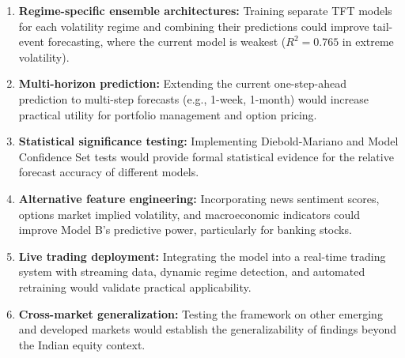 \begin{enumerate}
    \item \textbf{Regime-specific ensemble architectures:} Training separate TFT models for each volatility regime and combining their predictions could improve tail-event forecasting, where the current model is weakest ($R^2 = 0.765$ in extreme volatility).

    \item \textbf{Multi-horizon prediction:} Extending the current one-step-ahead prediction to multi-step forecasts (e.g., 1-week, 1-month) would increase practical utility for portfolio management and option pricing.

    \item \textbf{Statistical significance testing:} Implementing Diebold-Mariano and Model Confidence Set tests would provide formal statistical evidence for the relative forecast accuracy of different models.

    \item \textbf{Alternative feature engineering:} Incorporating news sentiment scores, options market implied volatility, and macroeconomic indicators could improve Model B's predictive power, particularly for banking stocks.

    \item \textbf{Live trading deployment:} Integrating the model into a real-time trading system with streaming data, dynamic regime detection, and automated retraining would validate practical applicability.

    \item \textbf{Cross-market generalization:} Testing the framework on other emerging and developed markets would establish the generalizability of findings beyond the Indian equity context.
\end{enumerate}

\pagebreak
